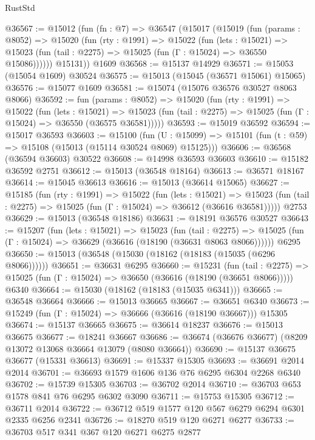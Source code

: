 \begin{lexlean}{RustStd}
\begin{coremodule}
@36567 := @15012
    (fun (fn : @7) =>
    @36547
      (@15017
        (@15019
          (fun (params : @8052) =>
          @15020
            (fun (rty : @1991) =>
            @15022
              (fun (lets : @15021) =>
              @15023 (fun (tail : @2275) => @15025 (fun (Γ : @15024) => @36550 @15086))))))
        @15131))
    @1609
@36568 := @15137 @14929
@36571 := @15053 (@15054 @1609) @30524
@36575 := @15013 (@15045 (@36571 @15061) @15065)
@36576 := @15077 @1609
@36581 := @15074 (@15076 @36576 @30527 @8063 @8066)
@36592 := fun (params : @8052) =>
  @15020
    (fun (rty : @1991) =>
    @15022
      (fun (lets : @15021) =>
      @15023 (fun (tail : @2275) => @15025 (fun (Γ : @15024) => @36550 (@36575 @36581)))))
@36593 := @15019 @36592
@36594 := @15017 @36593
@36603 := @15100
    (fun (U : @15099) => @15101 (fun (t : @59) => @15108 (@15013 (@15114 @30524 @8069) @15125)))
@36606 := @36568 (@36594 @36603) @30522
@36608 := @14998 @36593 @36603
@36610 := @15182 @36592 @2751
@36612 := @15013 (@36548 @18164)
@36613 := @36571 @18167
@36614 := @15045 @36613
@36616 := @15013 (@36614 @15065)
@36627 := @15185
    (fun (rty : @1991) =>
    @15022
      (fun (lets : @15021) =>
      @15023 (fun (tail : @2275) => @15025 (fun (Γ : @15024) => @36612 (@36616 @36581)))))
    @2753
@36629 := @15013 (@36548 @18186)
@36631 := @18191 @36576 @30527
@36643 := @15207
    (fun (lets : @15021) =>
    @15023
      (fun (tail : @2275) =>
      @15025 (fun (Γ : @15024) => @36629 (@36616 (@18190 (@36631 @8063 @8066))))))
    @6295
@36650 := @15013 (@36548 (@15030 (@18162 (@18183 (@15035 (@6296 @8066))))))
@36651 := @36631 @6295
@36660 := @15231
    (fun (tail : @2275) => @15025 (fun (Γ : @15024) => @36650 (@36616 (@18190 (@36651 @8066)))))
    @6340
@36664 := @15030 (@18162 (@18183 (@15035 @6341)))
@36665 := @36548 @36664
@36666 := @15013 @36665
@36667 := @36651 @6340
@36673 := @15249 (fun (Γ : @15024) => @36666 (@36616 (@18190 @36667))) @15305
@36674 := @15137 @36665
@36675 := @36614 @18237
@36676 := @15013 @36675
@36677 := @18241 @36667
@36686 := @36674 (@36676 @36677) (@8209 @13072 @13068 @36664 @13079 (@8080 @36664))
@36690 := @15137 @36675 @36677 (@15331 @36613)
@36691 := @15337 @15305
@36693 := @36691 @2014 @2014
@36701 := @36693 @1579 @1606 @136 @76 @6295 @6304 @2268 @6340
@36702 := @15739 @15305
@36703 := @36702 @2014
@36710 := @36703 @653 @1578 @841 @76 @6295 @6302 @3090
@36711 := @15753 @15305
@36712 := @36711 @2014
@36722 := @36712 @519 @1577 @120 @567 @6279 @6294 @6301 @2335 @6256 @2341
@36726 := @18270 @519 @120 @6271 @6277
@36733 := @36703 @517 @341 @367 @120 @6271 @6275 @2877

\end{coremodule}
\end{lexlean}
